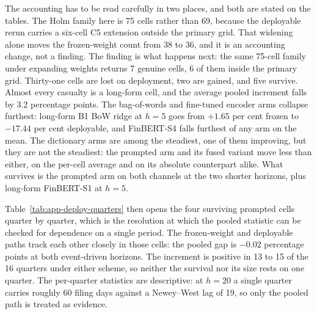 The accounting has to be read carefully in two places, and both are stated
on the tables. The Holm family here is 75 cells rather than 69, because the
deployable rerun carries a six-cell C5 extension outside the primary grid.
That widening alone moves the frozen-weight count from 38 to 36, and it is
an accounting change, not a finding. The finding is what happens next: the
same 75-cell family under expanding weights returns 7 genuine cells, 6 of
them inside the primary grid. Thirty-one cells are lost on deployment, two
are gained, and five survive. Almost every casualty is a long-form cell,
and the average pooled increment falls by 3.2 percentage points. The
bag-of-words and fine-tuned encoder arms collapse furthest: long-form B1 BoW
ridge at $h{=}5$ goes from $+1.65$ per cent frozen to $-17.44$ per cent
deployable, and FinBERT-S4 falls furthest of any arm on the mean. The
dictionary arms are among the steadiest, one of them improving, but they are
not the steadiest: the prompted arm and its fused variant move less than
either, on the per-cell average and on its absolute counterpart alike.
What survives is the prompted arm on both channels at the two
shorter horizons, plus long-form FinBERT-S1 at $h{=}5$.

Table~\ref{tab:app-deploy-quarters} then opens the four surviving prompted
cells quarter by quarter, which is the resolution at which the pooled
statistic can be checked for dependence on a single period. The
frozen-weight and deployable paths track each other closely in those
cells: the pooled gap is $-0.02$ percentage points at both event-driven
horizons. The increment is positive in 13 to 15 of the 16 quarters
under either scheme, so neither the survival nor its size rests on one
quarter. The per-quarter statistics are descriptive: at $h{=}20$ a single
quarter carries roughly 60 filing days against a Newey--West lag of 19, so
only the pooled path is treated as evidence.

